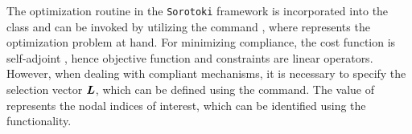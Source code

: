 The optimization routine in the \texttt{Sorotoki} framework is incorporated into the  class and can be invoked by utilizing the command , where  represents the optimization problem at hand. For minimizing compliance, the cost function is self-adjoint \cite{Bendsoe2003}, hence objective function and constraints are linear operators. However, when dealing with compliant mechanisms, it is necessary to specify the selection vector ${\boldsymbol{L}}$, which can be defined using the  command. The value of  represents the nodal indices of interest, which can be identified using the  functionality.


